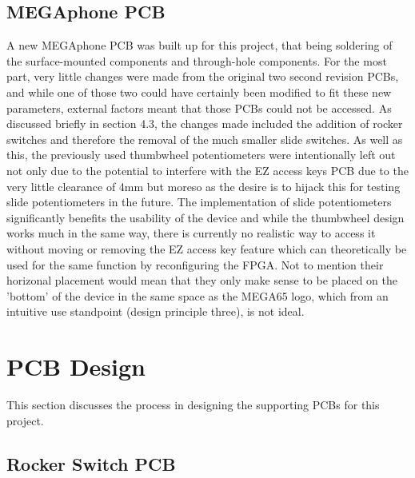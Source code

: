 \subsection{MEGAphone PCB}
A new MEGAphone PCB was built up for this project, that being soldering of the surface-mounted components and through-hole components.
For the most part, very little changes were made from the original two second revision PCBs, and while one of those two could have certainly been modified to fit these new parameters, external factors meant that those PCBs could not be accessed.
As discussed briefly in section 4.3, the changes made included the addition of rocker switches and therefore the removal of the much smaller slide switches. %
As well as this, the previously used thumbwheel potentiometers were intentionally left out not only due to the potential to interfere with the EZ access keys PCB due to the very little clearance of 4mm but moreso as the desire is to hijack this for testing slide potentiometers in the future.
The implementation of slide potentiometers significantly benefits the usability of the device and while the thumbwheel design works much in the same way, there is currently no realistic way to access it without moving or removing the EZ access key feature which can theoretically be used for the same function by reconfiguring the FPGA.
Not to mention their horizonal placement would mean that they only make sense to be placed on the 'bottom' of the device in the same space as the MEGA65 logo, which from an intuitive use standpoint (design principle three), is not ideal.


\section{PCB Design}
This section discusses the process in designing the supporting PCBs for this project.

\subsection{Rocker Switch PCB}

